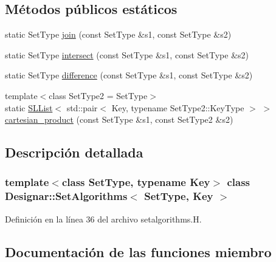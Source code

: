 \subsection*{Métodos públicos estáticos}
\begin{DoxyCompactItemize}
\item 
static Set\+Type \hyperlink{class_designar_1_1_set_algorithms_a7c90ff36ab84939edeebc6a35a4d8470}{join} (const Set\+Type \&s1, const Set\+Type \&s2)
\item 
static Set\+Type \hyperlink{class_designar_1_1_set_algorithms_a164c8098fec320646d65b4e20d62dc15}{intersect} (const Set\+Type \&s1, const Set\+Type \&s2)
\item 
static Set\+Type \hyperlink{class_designar_1_1_set_algorithms_a913f9ab2d7513f80ea82bddd46b70b2b}{difference} (const Set\+Type \&s1, const Set\+Type \&s2)
\item 
{\footnotesize template$<$class Set\+Type2  = Set\+Type$>$ }\\static \hyperlink{class_designar_1_1_s_l_list}{S\+L\+List}$<$ std\+::pair$<$ Key, typename Set\+Type2\+::\+Key\+Type $>$ $>$ \hyperlink{class_designar_1_1_set_algorithms_a073d248569ea209dd02729486c617047}{cartesian\+\_\+product} (const Set\+Type \&s1, const Set\+Type2 \&s2)
\end{DoxyCompactItemize}


\subsection{Descripción detallada}
\subsubsection*{template$<$class Set\+Type, typename Key$>$\newline
class Designar\+::\+Set\+Algorithms$<$ Set\+Type, Key $>$}



Definición en la línea 36 del archivo setalgorithms.\+H.



\subsection{Documentación de las funciones miembro}
\mbox{\label{class_designar_1_1_set_algorithms_a073d248569ea209dd02729486c617047}} 
